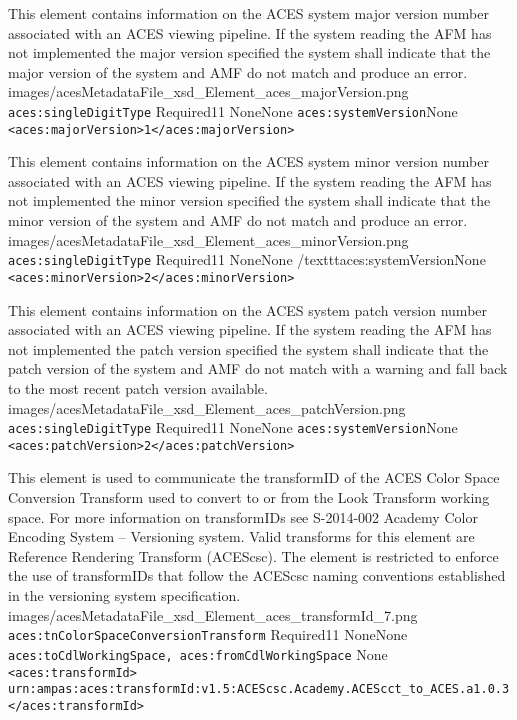         {This element contains information on the ACES system major version number associated with an ACES viewing pipeline.  If the system reading the AFM has not implemented the major version specified the system shall indicate that the major version of the system and AMF do not match and produce an error.}
        {images/acesMetadataFile_xsd_Element_aces_majorVersion.png}
        {\texttt{aces:singleDigitType}}
        {Required}{1}{1}
        {None}{None}
        {\texttt{aces:systemVersion}}{None}
        {\lstinline{<aces:majorVersion>1</aces:majorVersion>}}

        {This element contains information on the ACES system minor version number associated with an ACES viewing pipeline.  If the system reading the AFM has not implemented the minor version specified the system shall indicate that the minor version of the system and AMF do not match and produce an error.}
        {images/acesMetadataFile_xsd_Element_aces_minorVersion.png}
        {\texttt{aces:singleDigitType}}
        {Required}{1}{1}
        {None}{None}
        {/texttt{aces:systemVersion}}{None}
        {\lstinline{<aces:minorVersion>2</aces:minorVersion>}}

        {This element contains information on the ACES system patch version number associated with an ACES viewing pipeline.  If the system reading the AFM has not implemented the patch version specified the system shall indicate that the patch version of the system and AMF do not match with a warning and fall back to the most recent patch version available.}
        {images/acesMetadataFile_xsd_Element_aces_patchVersion.png}
        {\texttt{aces:singleDigitType}}
        {Required}{1}{1}
        {None}{None}
        {\texttt{aces:systemVersion}}{None}
        {\lstinline{<aces:patchVersion>2</aces:patchVersion>}}

        {This element is used to communicate the transformID of the ACES Color Space Conversion Transform used to convert to or from the Look Transform working space.  For more information on transformIDs see S-2014-002 Academy Color Encoding System -- Versioning system.  Valid transforms for this element are Reference Rendering Transform (ACEScsc).  The element is restricted to enforce the use of transformIDs that follow the ACEScsc naming conventions established in the versioning system specification.}
        {images/acesMetadataFile_xsd_Element_aces_transformId_7.png}
        {\texttt{aces:tnColorSpaceConversionTransform}}
        {Required}{1}{1}
        {None}{None}
        {\texttt{aces:toCdlWorkingSpace, aces:fromCdlWorkingSpace}}
        {None}
        {\lstinline{<aces:transformId>}\\
        \lstinline{urn:ampas:aces:transformId:v1.5:ACEScsc.Academy.ACEScct_to_ACES.a1.0.3}\\
        \lstinline{</aces:transformId>}}

